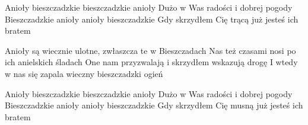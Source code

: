 \documentclass[../../../songbook.tex]{subfiles}
\begin{document}
\-\hspace{1cm} Anioły bieszczadzkie bieszczadzkie anioły \newline
\-\hspace{1cm} Dużo w Was radości i dobrej pogody \newline
\-\hspace{1cm} Bieszczadzkie anioły anioły bieszczadzkie \newline
\-\hspace{1cm} Gdy skrzydłem Cię trącą już jesteś ich bratem \newline

Anioły są wiecznie ulotne, zwłaszcza te w Bieszczadach \newline
Nas też czasami nosi po ich anielskich śladach \newline
One nam przyzwalają i skrzydłem wskazują drogę \newline
I wtedy w nas się zapala wieczny bieszczadzki ogień \newline

\-\hspace{1cm} Anioły bieszczadzkie bieszczadzkie anioły \newline
\-\hspace{1cm} Dużo w Was radości i dobrej pogody \newline
\-\hspace{1cm} Bieszczadzkie anioły anioły bieszczadzkie \newline
\-\hspace{1cm} Gdy skrzydłem Cię musną już jesteś ich bratem \newline
\end{document}
